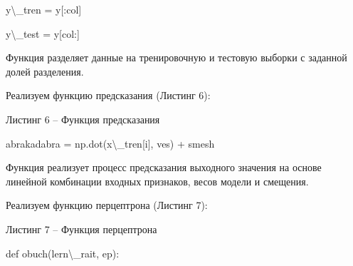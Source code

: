 \documentclass{article}%
\begin{document}
\begin{enumerate}
\begin{flushleft}
y\textbackslash{}_tren = y[:col]%
%
\end{flushleft}%
\begin{flushleft}%
y\textbackslash{}_test = y[col:]%
%
\end{flushleft}%
\begin{flushleft}%
Функция разделяет данные на тренировочную и тестовую выборки с заданной долей разделения.%
%
\end{flushleft}%
\begin{flushleft}%
Реализуем функцию предсказания (Листинг 6):%
%
\end{flushleft}%
\begin{flushleft}%
Листинг 6 – Функция предсказания%
%
\end{flushleft}%
\begin{flushleft}%
abrakadabra = np.dot(x\textbackslash{}_tren[i], ves) + smesh%
%
\end{flushleft}%
\begin{flushleft}%
Функция реализует процесс предсказания выходного значения на основе линейной комбинации входных признаков, весов модели и смещения.%
%
\end{flushleft}%
\begin{flushleft}%
Реализуем функцию перцептрона (Листинг 7):%
%
\end{flushleft}%
\begin{flushleft}%
Листинг 7 – Функция перцептрона%
%
\end{flushleft}%
\begin{flushleft}%
def obuch(lern\textbackslash{}_rait, ep):%
%
\end{flushleft}%
\begin{flushleft}%

\end{flushleft}
\end{enumerate}
\end{document}

